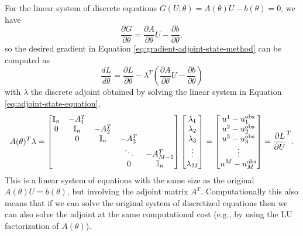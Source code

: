 For the linear system of discrete equations $G(U; \theta)=A(\theta) U - b(\theta)=0$, we have 
\begin{equation}
    \frac{\partial G}{\partial \theta} 
    = 
    \frac{\partial A }{\partial \theta} U - \frac{\partial b}{\partial \theta},
\end{equation}
so the desired gradient in Equation \eqref{eq:gradient-adjoint-state-method} can be computed as 
\begin{equation}
    \frac{dL}{d\theta} 
    = 
    \frac{\partial L}{\partial \theta} 
    - 
    \lambda^T \left( \frac{\partial A }{\partial \theta} U - \frac{\partial b}{\partial \theta} \right)
    \label{eq:dhdtheta_linear}
\end{equation}
with $\lambda$ the discrete adjoint obtained by solving the linear system in Equation \eqref{eq:adjoint-state-equation},
\begin{equation}
    A(\theta)^T \lambda 
    =
    \begin{bmatrix}
        \operatorname{\mathbb{I}}_{n} & -A_1^T &   &  & \\
        0 & \operatorname{\mathbb{I}}_{n} & -A_2^T &  &  \\
          & 0 & \operatorname{\mathbb{I}}_{n} & -A_3^T &  \\
         &  &   & \ddots & -A_{M-1}^T  \\
         &  &  & 0 & \operatorname{\mathbb{I}}_{n}
    \end{bmatrix}
    \begin{bmatrix}
        \lambda_1 \\
        \lambda_2 \\
        \lambda_3 \\
        \vdots \\
        \lambda_M
    \end{bmatrix}
    = 
    \begin{bmatrix}
        u^1 - u_1^\text{obs} \\
        u^2 - u_2^\text{obs} \\
        u^3 - u_3^\text{obs} \\
        \vdots \\
        u^M - u_M^\text{obs}     
    \end{bmatrix}
    = 
    \frac{\partial L}{\partial U}^T.
    \label{eq:linea-adjoint-state-equation}
\end{equation}
This is a linear system of equations with the same size as the original $A(\theta) U = b(\theta)$, but involving the adjoint matrix $A^T$. 
Computationally this also means that if we can solve the original system of discretized equations then we can also solve the adjoint at the same computational cost (e.g., by using the LU factorization of $A(\theta)$). 
